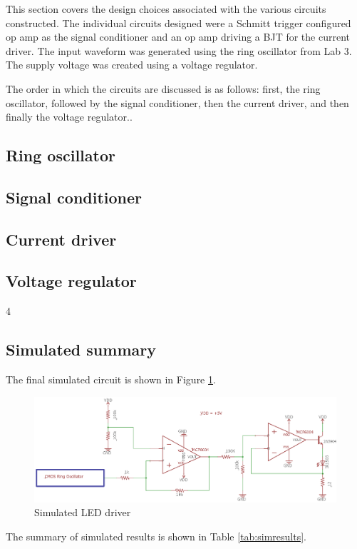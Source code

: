 



This section covers the design choices associated with the various circuits constructed. The individual circuits designed were a Schmitt trigger configured op amp as the signal conditioner and an op amp driving a BJT for the current driver. The input waveform was generated using the ring oscillator from Lab 3. The supply voltage was created using a voltage regulator.

The order in which the circuits are discussed is as follows: first, the ring oscillator, followed by the signal conditioner, then the current driver, and then finally the voltage regulator.. 

\subsection{Ring oscillator}


\subsection{Signal conditioner}


\subsection{Current driver}


\subsection{Voltage regulator}
4


\subsection{Simulated summary}
The final simulated circuit is shown in Figure \ref{fig:finalschemlab4}.
\begin{figure}
	\centering
	\includegraphics[width=0.7\linewidth]{CircuitDevelopment/FinalschemLab4}
	\caption[Simulated circuit]{Simulated LED driver}
	\label{fig:finalschemlab4}
\end{figure}
The summary of simulated results is shown in Table \ref{tab:simresults}.

